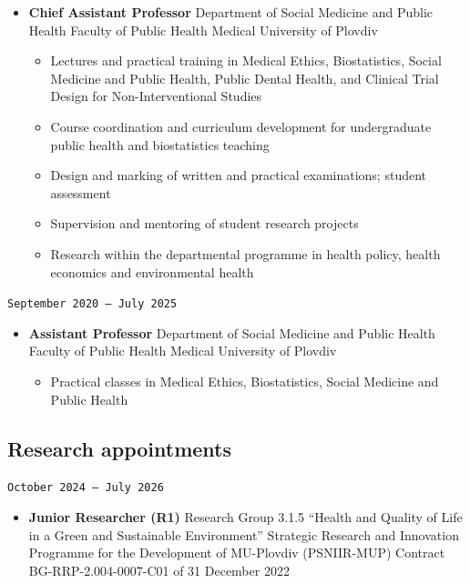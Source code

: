 \documentclass[
  10.5pt,
  a4paper,
  DIV=11,
  numbers=noendperiod]{scrartcl}
\providecommand{\tightlist}{%
  \setlength{\itemsep}{0pt}\setlength{\parskip}{0pt}}
\let\oldtexttt\texttt
\renewcommand{\texttt}[1]{{\color{cvbronze}\small\oldtexttt{#1}}}
\begin{document}
\begin{itemize}
\tightlist
\item
  \textbf{Chief Assistant Professor} \textbar{} Department of Social
  Medicine and Public Health \textbar{} Faculty of Public Health
  \textbar{} Medical University of Plovdiv

  \begin{itemize}
  \tightlist
  \item
    Lectures and practical training in Medical Ethics, Biostatistics,
    Social Medicine and Public Health, Public Dental Health, and
    Clinical Trial Design for Non-Interventional Studies
  \item
    Course coordination and curriculum development for undergraduate
    public health and biostatistics teaching
  \item
    Design and marking of written and practical examinations; student
    assessment
  \item
    Supervision and mentoring of student research projects
  \item
    Research within the departmental programme in health policy, health
    economics and environmental health
  \end{itemize}
\end{itemize}

\texttt{September\ 2020\ –\ July\ 2025}

\begin{itemize}
\tightlist
\item
  \textbf{Assistant Professor} \textbar{} Department of Social Medicine
  and Public Health \textbar{} Faculty of Public Health \textbar{}
  Medical University of Plovdiv

  \begin{itemize}
  \tightlist
  \item
    Practical classes in Medical Ethics, Biostatistics, Social Medicine
    and Public Health
  \end{itemize}
\end{itemize}

\subsection{Research appointments}\label{research-appointments}

\texttt{October\ 2024\ –\ July\ 2026}

\begin{itemize}
\tightlist
\item
  \textbf{Junior Researcher (R1)} \textbar{} Research Group 3.1.5
  ``Health and Quality of Life in a Green and Sustainable Environment''
  \textbar{} Strategic Research and Innovation Programme for the
  Development of MU-Plovdiv (PSNIIR-MUP) \textbar{} Contract
  BG-RRP-2.004-0007-C01 of 31 December 2022
\end{itemize}
\end{document}
